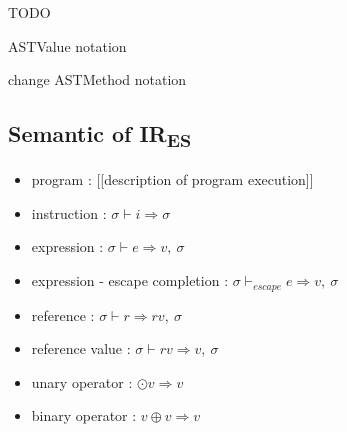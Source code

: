 \documentclass[11pt]{article}
\newcommand{\irname}[0]{IR\textsubscript{ES}\xspace}
\newcommand{\symstate}[0]{\sigma}
\newcommand{\symuop}[0]{\odot}
\newcommand{\symbop}[0]{\oplus}
\newcommand{\evaluop}[2]{\symuop #1 \Rightarrow #2}
\newcommand{\evalbop}[3]{#1 \symbop #2 \Rightarrow #3}
\newcommand{\evalinst}[3]{#1 \vdash #2 \Rightarrow #3}
\newcommand{\evalexpr}[4]{#1 \vdash #2 \Rightarrow #3,\ #4}
\newcommand{\evalescexpr}[4]{#1 \vdash_{escape} #2 \Rightarrow #3,\ #4}
\newcommand{\evalref}[4]{#1 \vdash #2 \Rightarrow #3,\ #4}
\newcommand{\evalrefv}[4]{#1 \vdash #2 \Rightarrow #3,\ #4}
\begin{document}
TODO

ASTValue notation

change ASTMethod notation






\newpage

\subsection{Semantic of \irname}

\begin{itemize}
  \item program : [[description of program execution]]
  \item instruction : $\evalinst{\symstate}{i}{\symstate}$
  \item expression : $\evalexpr{\symstate}{e}{v}{\symstate}$
  \item expression - escape completion :
  $\evalescexpr{\symstate}{e}{v}{\symstate}$
  \item reference : $\evalref{\symstate}{r}{rv}{\symstate}$
  \item reference value : $\evalrefv{\symstate}{rv}{v}{\symstate}$
  \item unary operator : $\evaluop{v}{v}$
  \item binary operator : $\evalbop{v}{v}{v}$
\end{itemize}



\end{document}
